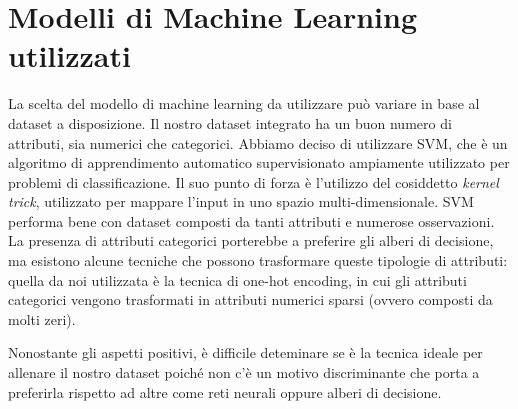 \section{Modelli di Machine Learning utilizzati}

La scelta del modello di machine learning da utilizzare può variare in base al dataset a disposizione. Il nostro dataset integrato ha un buon numero di attributi, sia numerici che categorici.
Abbiamo deciso di utilizzare SVM, che è un algoritmo di apprendimento automatico supervisionato ampiamente utilizzato per problemi di classificazione. Il suo punto di forza è l'utilizzo del cosiddetto \textit{kernel trick}, utilizzato per mappare l'input in uno spazio multi-dimensionale. SVM performa bene con dataset composti da tanti attributi e numerose osservazioni.
La presenza di attributi categorici porterebbe a preferire gli alberi di decisione, ma esistono alcune tecniche che possono trasformare queste tipologie di attributi: quella da noi utilizzata è la tecnica di one-hot encoding, in cui gli attributi categorici vengono trasformati in attributi numerici sparsi (ovvero composti da molti zeri).

Nonostante gli aspetti positivi, è difficile deteminare se è la tecnica ideale per allenare il nostro dataset poiché non c'è un motivo discriminante che porta a preferirla rispetto ad altre come reti neurali oppure alberi di decisione.

